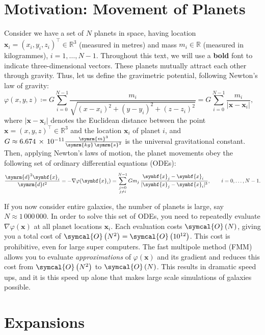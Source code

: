 \documentclass{scrbook}
\newcommand{\reals}{\ensuremath{\mathbb{R}}}
\newcommand{\wholespace}{\ensuremath{\reals^3}}
\newcommand{\vv}[1]{\ensuremath{\symbf{#1}}} %
\newcommand{\dd}{\ensuremath{\symrm{d}}}     %
\newcommand{\bigO}[1]{\ensuremath{\symcal{O}\left({#1}\right)}}
\begin{document}
\section{Motivation: Movement of Planets}
Consider we have a set of $N$ planets in space, having location
$\vv{x}_i = (x_i,y_i,z_i)^\top\in\wholespace$ (measured in metres) and mass
$m_i\in\reals$ (measured in kilogrammes), $i=1,\dotsc,N-1$. Throughout this
text, we will use a \textbf{bold} font to indicate three-dimensional vectors.
These planets mutually attract each other through gravity. Thus, let us define
the gravimetric potential, following Newton's law of gravity:
\begin{equation}\label{eqn:gravimetric-potential}
\varphi(x,y,z)\coloneqq
G\sum_{i=0}^{N-1}\frac{m_i}{\sqrt{(x-x_i)^2 + 
(y-y_i)^2 + (z-z_i)^2}} = 
G\sum_{i=0}^{N-1}\frac{m_i}{|\vv{x}-\vv{x}_i|},
\qquad
\end{equation}
where $|\vv{x}-\vv{x}_i|$ denotes the Euclidean distance between the point
$\vv{x}=(x,y,z)^\top\in\wholespace$ and the location $\vv{x}_i$ of planet $i$,
and $G\approx6.674\,\times\,10^{-11}\frac{\symrm{m}^3}{\symrm{kg}\,\symrm{s}^2}$
is the universal gravitational constant. Then, applying Newton's laws of
motion, the planet movements obey the following set of ordinary differential
equations (ODEs):
\begin{equation}
\frac{\dd^2\vv{x}_i}{\dd t^2} = -\nabla\varphi(\vv{x}_i) =
\sum_{\substack{j=0\\j\neq i}}^{N-1}
Gm_j\,\frac{\phantom{|}\vv{x}_j-\vv{x}_i\phantom{|^3}}{|\vv{x}_j-\vv{x}_i|^3},
\qquad i = 0,\dotsc,N-1.
\end{equation}

If you now consider entire galaxies, the number of planets is large, say
$N\approx 1\,000\,000$. In order to solve this set of ODEs, you need to
repeatedly evaluate $\nabla\varphi(\vv{x})$ at all planet locations
$\vv{x}_i$. Each evaluation costs \bigO{N}, giving you a total cost of
$\bigO{N^2}=\bigO{10^{12}}$. This cost is prohibitive, even for large super
computers. The fast multipole method (FMM) allows you to evaluate
\emph{approximations} of $\varphi(\vv{x})$ and its gradient and reduces this
cost from \bigO{N^2} to \bigO{N}. This results in dramatic speed ups, and it 
is this speed up alone that makes large scale simulations of galaxies possible.

\section{Expansions}
\end{document}

